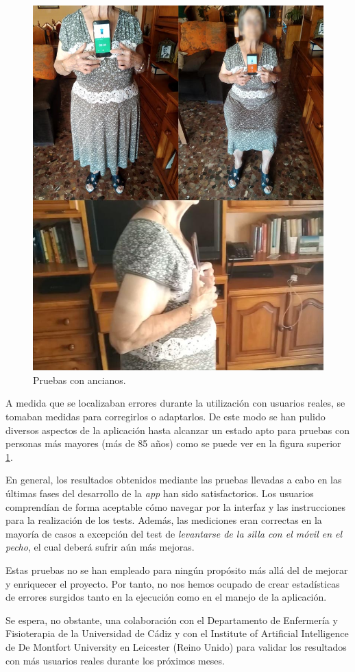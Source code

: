 \begin{figure}[H]
	\centering
	\includegraphics[scale=1.5]{imagenes/pruebas.jpg}
	\caption{Pruebas con ancianos.\label{fig:pruebas_mayores}}
\end{figure}

A medida que se localizaban errores durante la utilización con usuarios reales, se tomaban medidas para corregirlos o adaptarlos. De este modo se han pulido diversos aspectos de la aplicación hasta alcanzar un estado apto para pruebas con personas más mayores (más de 85 años) como se puede ver en la figura superior \ref{fig:pruebas_mayores}.

En general, los resultados obtenidos mediante las pruebas llevadas a cabo en las últimas fases del desarrollo de la \textit{app} han sido satisfactorios. Los usuarios comprendían de forma aceptable cómo navegar por la interfaz y las instrucciones para la realización de los tests. Además, las mediciones eran correctas en la mayoría de casos a excepción del test de \textit{levantarse de la silla con el móvil en el pecho}, el cual deberá sufrir aún más mejoras.

Estas pruebas no se han empleado para ningún propósito más allá del de mejorar y enriquecer el proyecto. Por tanto, no nos hemos ocupado de crear estadísticas de errores surgidos tanto en la ejecución como en el manejo de la aplicación.

Se espera, no obstante, una colaboración con el Departamento de Enfermería y Fisioterapia de la Universidad de Cádiz y con el Institute of Artificial Intelligence de De Montfort University en Leicester (Reino Unido) para validar los resultados con más usuarios reales durante los próximos meses.
